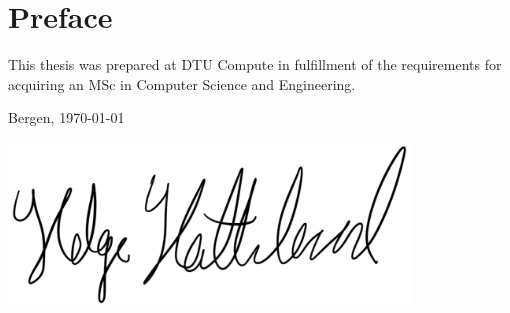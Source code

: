 \chapter{Preface}

This thesis was prepared at DTU Compute in fulfillment of the requirements for acquiring an MSc in Computer Science and Engineering.

\begin{center}
    \vspace{3cm}
    Bergen, \today
    
    \vspace{1cm}
    \includegraphics[width=0.8\textwidth]{frontmatter/Sign3.png}
    
    \vspace{1cm}
\end{center}
